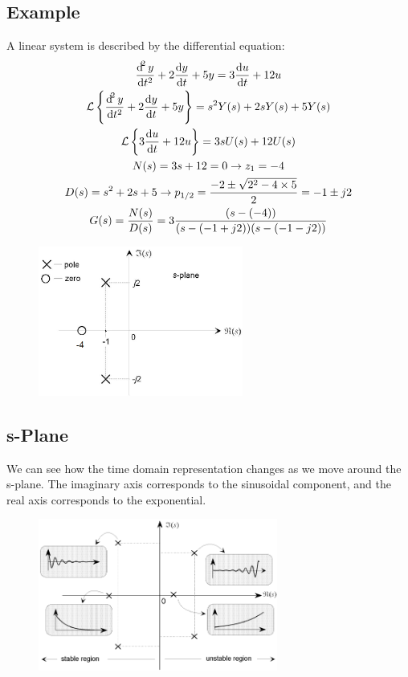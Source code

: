 \documentclass[class=report, crop=false, 12pt,a4paper, tikz, border=4mm]{standalone}
\begin{document}
\subsection{Example}
A linear system is described by the differential equation:
\begin{gather}
  \frac{\dif^2y}{\dif t^2} + 2\frac{\dif y}{\dif t} + 5y = 3\frac{\dif u}{\dif t} + 12u\\
  \mathcal{L} \left\{ \frac{\dif^2y}{\dif t^2} + 2\frac{\dif y}{\dif t} + 5y \right\} = s^2 Y(s) + 2sY(s) + 5Y(s)\\
  \mathcal{L} \left\{ 3\frac{\dif u}{\dif t} + 12u \right\} = 3sU(s) + 12U(s)\\
  N(s) = 3s + 12 = 0 \rightarrow z_1 = -4\\
  D(s) = s^2 + 2s + 5 \rightarrow p_{1/2} = \frac{-2 \pm \sqrt{2^2 - 4\times 5}}{2} = -1 \pm j2\\
  G(s) = \frac{N(s)}{D(s)} = 3 \frac{(s-(-4))}{(s-(-1+j2))(s-(-1-j2))} 
\end{gather}
\begin{figure}[H]
  \centering
  \includegraphics[width = 0.6\textwidth]{../img/diagram35.png}
\end{figure}
\subsection{s-Plane}
We can see how the time domain representation changes as we move around the s-plane. The imaginary axis corresponds to the sinusoidal component, and the real axis corresponds to the exponential.
\begin{figure}[H]
  \centering
  \includegraphics[width = 0.7\textwidth]{../img/diagram36.png}
\end{figure}
\end{document}
